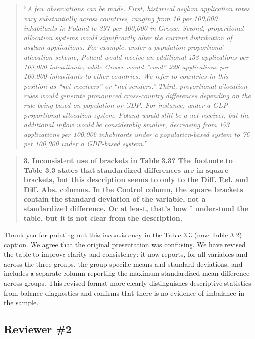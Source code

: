 \documentclass[
  11pt,
]{article}
\begin{document}
\begin{quote}
``\emph{A few observations can be made. First, historical asylum application rates vary substantially across countries, ranging from 16 per 100,000 inhabitants in Poland to 397 per 100,000 in Greece. Second, proportional allocation systems would significantly alter the current distribution of asylum applications. For example, under a population-proportional allocation scheme, Poland would receive an additional 153 applications per 100,000 inhabitants, while Greece would ''send'' 228 applications per 100,000 inhabitants to other countries. We refer to countries in this position as ``net receivers'' or ``net senders.'' Third, proportional allocation rules would generate pronounced cross-country differences depending on the rule being based on population or GDP. For instance, under a GDP-proportional allocation system, Poland would still be a net receiver, but the additional inflow would be considerably smaller, decreasing from 153 applications per 100,000 inhabitants under a population-based system to 76 per 100,000 under a GDP-based system.}''
\end{quote}

\begin{quote}
\textbf{3. Inconsistent use of brackets in Table 3.3? The footnote to Table 3.3 states that standardized differences are in square brackets, but this description seems to only to the Diff. Rel. and Diff. Abs. columns. In the Control column, the square brackets contain the standard deviation of the variable, not a standardized difference. Or at least, that's how I understood the table, but it is not clear from the description.}
\end{quote}

Thank you for pointing out this inconsistency in the Table 3.3 (now Table 3.2) caption. We agree that the original presentation was confusing. We have revised the table to improve clarity and consistency: it now reports, for all variables and across the three groups, the group-specific means and standard deviations, and includes a separate column reporting the maximum standardized mean difference across groups. This revised format more clearly distinguishes descriptive statistics from balance diagnostics and confirms that there is no evidence of imbalance in the sample.

\subsection{Reviewer \#2}\label{reviewer-2}
\end{document}
